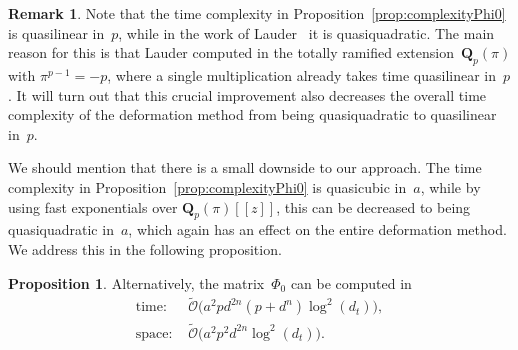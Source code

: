 \documentclass[a4paper,11pt]{article}
\numberwithin{equation}{section}
\newcommand{\QQ}{\mathbf{Q}} %
\providecommand{\SoftOh}{\tilde{\mathcal{O}}} %
\theoremstyle{definition}
\newtheorem{prop}[thm]{Proposition}
\newtheorem{rem}[thm]{Remark}
\begin{document}
\begin{rem}
Note that the time complexity in Proposition~\ref{prop:complexityPhi0} 
is quasilinear in~$p$, while in the work of Lauder~\citep{Lauder2004a} 
it is quasiquadratic.  The main reason for this is that Lauder computed 
in the totally ramified extension~$\QQ_p(\pi)$ with $\pi^{p-1}=-p$, 
where a single multiplication already takes time quasilinear in~$p$.  It will turn out 
that this crucial improvement also decreases the overall time complexity 
of the deformation method from being quasiquadratic to quasilinear in~$p$.

We should mention that there is a small downside to our approach.  The time 
complexity in Proposition~\ref{prop:complexityPhi0} is quasicubic in~$a$, 
while by using fast exponentials over $\QQ_p(\pi)[[z]]$, this can be 
decreased to being quasiquadratic in~$a$, which again has an effect on the 
entire deformation method.  We address this in the following proposition.
\end{rem}

\begin{prop} \label{prop:compPhi0}
Alternatively, the matrix~$\Phi_0$ can be computed in 
\begin{align*}
\mbox{time: }  &\SoftOh\bigl(a^2 p d^{2n} (p + d^n) \log^2(d_t) \bigr), \\
\mbox{space: } &\SoftOh\bigl(a^2 p^2 d^{2n} \log^2(d_t)\bigr).
\end{align*}
\end{prop}
\end{document}
